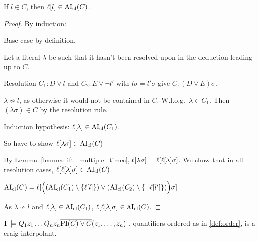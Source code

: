 \documentclass[,%
	paper=a4,%
	DIV14, 
	liststotoc,
	bibtotoc,
	draft=false,%
	numbers=noendperiod
]{scrartcl}
\begin{document}
\begin{lemma}

  If $l \in C$, then $\ell[l] \in \operatorname{AI}_\mathrm{cl}(C)$.
  \label{lemma:literals_in_aiclause}
\end{lemma}
\begin{proof} By induction:

  Base case by definition.

  Let a literal $\lambda$ be such that it hasn't been resolved upon in the deduction leading up to $C$.

  Resolution $C_1 : D \lor l$ and $C_2 : E \lor \lnot l'$ with $l\sigma = l'\sigma$ give $C: (D\lor E)\sigma$.

  $\lambda \not\sim l$, as otherwise it would not be contained in $C$.
  W.l.o.g.\ $\lambda \in C_1$.
  Then $(\lambda\sigma) \in C$ by the resolution rule.

  Induction hypothesis: $\ell[\lambda] \in \operatorname{AI}_\mathrm{cl}(C_1)$.

  So have to show $ \ell[\lambda\sigma] \in \operatorname{AI}_\mathrm{cl}(C)$ 

  By Lemma~\ref{lemma:lift_multiple_times},
  $\ell[\lambda\sigma] = \ell[\ell[\lambda]\sigma]$.
  We show that in all resolution cases, $\ell[\ell[\lambda] \sigma] \in \operatorname{AI}_\mathrm{cl}(C)$.

      $\operatorname{AI}_\mathrm{cl}(C) = \ell[ \Big( (\operatorname{AI}_\mathrm{cl}(C_1) \setminus \{\ell[l]\}) \lor (\operatorname{AI}_\mathrm{cl}(C_2) \setminus \{\lnot         \ell[l']\}) \Big) \sigma] $

      As $\lambda \not\sim l$ and $\ell[\lambda] \in \operatorname{AI}_\mathrm{cl}(C_1)$, $\ell[\ell[\lambda] \sigma] \in \operatorname{AI}_\mathrm{cl}(C)  $.
\end{proof}



\clearpage

\begin{prop}
	$\Gamma \models Q_1 z_1 \ldots Q_n z_n \overline{\operatorname{PI}(C) \lor C}(z_1, \ldots, z_n)$ , quantifiers ordered as in \ref{def:order}, is a craig interpolant.
\end{prop}
\end{document}
